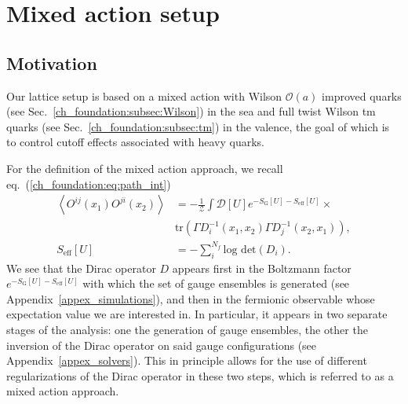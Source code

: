 \chapter{Mixed action setup}


\label{ch_ma}


\section{Motivation}
\label{ch_ma:sec:introduction}

Our lattice setup is based on a mixed action with Wilson $\mathcal{O}(a)$ improved quarks (see Sec.~\ref{ch_foundation:subsec:Wilson}) in the sea and full twist Wilson tm quarks (see Sec.~\ref{ch_foundation:subsec:tm}) in the valence, the goal of which is to control cutoff effects associated with heavy quarks.

For the definition of the mixed action approach, we recall eq.~(\ref{ch_foundation:eq:path_int})
\begin{align}
\left<O^{ij}(x_1)O^{ji}(x_2)\right>&=-\frac{1}{\mathcal{Z}}\int\mathcal{D}[U]e^{-S_{\textrm{G}}[U]-S_{\textrm{eff}}[U]}\times\\&{\textrm{tr}}\left(\Gamma D_i^{-1}(x_1,x_2)\Gamma D_j^{-1}(x_2,x_1)\right),\\
S_{\textrm{eff}}[U]&=-\sum_i^{N_f}\textrm{log det}(D_i).
\end{align} 
We see that the Dirac operator $D$ appears first in the Boltzmann factor $e^{-S_{\textrm{G}}[U]-S_{\textrm{eff}}[U]}$ with which the set of gauge ensembles is generated (see Appendix~\ref{appex_simulations}), and then in the fermionic observable whose expectation value we are interested in. In particular, it appears in two separate stages of the analysis: one the generation of gauge ensembles, the other the inversion of the Dirac operator on said gauge configurations (see Appendix~\ref{appex_solvers}). This in principle allows for the use of different regularizations of the Dirac operator in these two steps, which is referred to as a mixed action approach.

